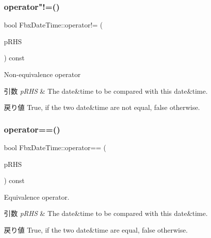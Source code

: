 \subsubsection{\texorpdfstring{operator"!=()}{operator!=()}}
{\footnotesize\ttfamily bool Fbx\+Date\+Time\+::operator!= (\begin{DoxyParamCaption}\item[{const \hyperlink{class_fbx_date_time}{Fbx\+Date\+Time} \&}]{p\+R\+HS }\end{DoxyParamCaption}) const}

Non-\/equivalence operator 
\begin{DoxyParams}{引数}
{\em p\+R\+HS} & The date\&time to be compared with this date\&time. \\
\hline
\end{DoxyParams}
\begin{DoxyReturn}{戻り値}
{\ttfamily True}, if the two date\&time are not equal, {\ttfamily false} otherwise. 
\end{DoxyReturn}
\mbox{\label{class_fbx_date_time_a881645b54b976cf8021a716b3046da96}} 
\subsubsection{\texorpdfstring{operator==()}{operator==()}}
{\footnotesize\ttfamily bool Fbx\+Date\+Time\+::operator== (\begin{DoxyParamCaption}\item[{const \hyperlink{class_fbx_date_time}{Fbx\+Date\+Time} \&}]{p\+R\+HS }\end{DoxyParamCaption}) const}

Equivalence operator. 
\begin{DoxyParams}{引数}
{\em p\+R\+HS} & The date\&time to be compared with this date\&time. \\
\hline
\end{DoxyParams}
\begin{DoxyReturn}{戻り値}
{\ttfamily True}, if the two date\&time are equal, {\ttfamily false} otherwise. 
\end{DoxyReturn}
\mbox{\label{class_fbx_date_time_a9ba087e7990d6cf6b3d004bfa2130f01}} 
